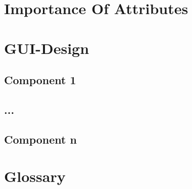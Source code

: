 \documentclass[10pt,a4paper]{report}
\begin{document}
\chapter{Importance Of Attributes}

\chapter{GUI-Design}
\section{Component 1}
\section{...}
\section{Component n}

\chapter{Glossary}
\end{document}
